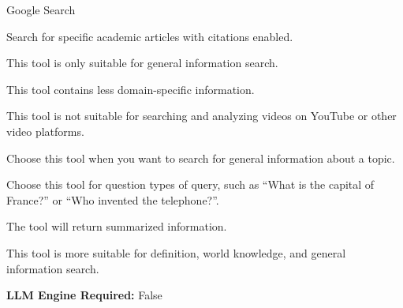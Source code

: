 \begin{tooldescbox}{{Google Search}}
\begin{itemize}[left=0pt, label={}, itemsep=0pt, parsep=0pt]
    \enspace{} Search for specific academic articles with citations enabled.
\end{itemize}
\begin{limitationbox}
\begin{toolenum}
    \item This tool is only suitable for general information search.
    \item This tool contains less domain-specific information.
    \item This tool is not suitable for searching and analyzing videos on YouTube or other video platforms.
\end{toolenum}
\end{limitationbox}

\begin{bestpracticebox}
\begin{toolenum}
    \item Choose this tool when you want to search for general information about a topic.
    \item Choose this tool for question types of query, such as ``What is the capital of France?'' or ``Who invented the telephone?''.
    \item The tool will return summarized information.
    \item This tool is more suitable for definition, world knowledge, and general information search.
\end{toolenum}
\end{bestpracticebox}

\textbf{LLM Engine Required:} False
\end{tooldescbox}
